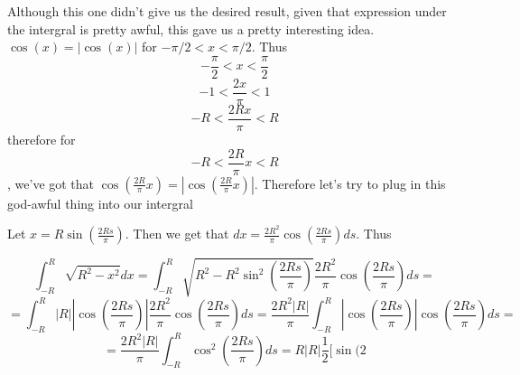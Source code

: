 \documentclass[11pt,oneside,titlepage]{book}
\begin{document}
Although this one didn't give us the desired result, given that expression under the intergral
is pretty awful, this gave us a pretty interesting idea. $\cos(x) = |\cos(x)|$ for
$- \pi/2 < x < \pi/2$. Thus
$$- \frac{\pi}{2} < x < \frac{\pi}{2}$$
$$- 1 <  \frac{2 x }{\pi} < 1$$
$$- R <  \frac{2 R x }{\pi} < R$$
therefore for $$- R <  \frac{2 R }{\pi} x < R$$, we've got that $\cos(\frac{2 R}{\pi} x) =
\left|\cos(\frac{2 R }{\pi} x)\right|$. Therefore let's try to plug in this god-awful
thing into our intergral

Let $x = R\sin(\frac{2 R s }{\pi})$. Then we get that
$dx =  \frac{2 R^2  }{\pi}\cos(\frac{2 R s }{\pi}) ds $. Thus

$$\int_{-R}^{R}{\sqrt{R^2 - x^2}dx} =
\int_{-R}^{R}{\sqrt{R^2 - R^2\sin^2(\frac{2 R s }{\pi})}
  \frac{2 R^2}{\pi}\cos(\frac{2 R s }{\pi}) ds} =
$$
$$ =
\int_{-R}^{R}{|R| |\cos(\frac{2 R s }{\pi})|
  \frac{2 R^2}{\pi}\cos(\frac{2 R s }{\pi}) ds} =
  \frac{2 R^2|R|}{\pi} \int_{-R}^{R}{|\cos(\frac{2 R s }{\pi})|
\cos(\frac{2 R s }{\pi}) ds} =
$$
$$ =
\frac{2 R^2|R|}{\pi} \int_{-R}^{R}{\cos^2(\frac{2 R s }{\pi}) ds} =
R|R| \frac 1 2 [\sin( 2
$$
\end{document}
